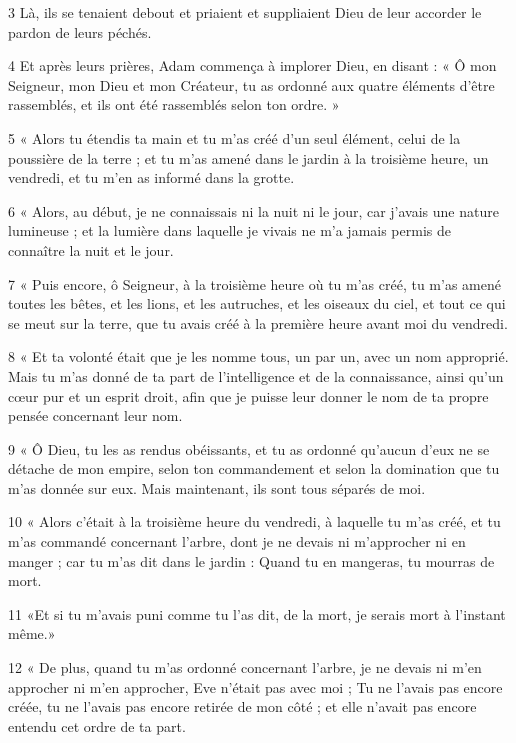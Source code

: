 \par 3 Là, ils se tenaient debout et priaient et suppliaient Dieu de leur accorder le pardon de leurs péchés.

\par 4 Et après leurs prières, Adam commença à implorer Dieu, en disant : « Ô mon Seigneur, mon Dieu et mon Créateur, tu as ordonné aux quatre éléments d'être rassemblés, et ils ont été rassemblés selon ton ordre. »

\par 5 « Alors tu étendis ta main et tu m'as créé d'un seul élément, celui de la poussière de la terre ; et tu m'as amené dans le jardin à la troisième heure, un vendredi, et tu m'en as informé dans la grotte.

\par 6 « Alors, au début, je ne connaissais ni la nuit ni le jour, car j'avais une nature lumineuse ; et la lumière dans laquelle je vivais ne m’a jamais permis de connaître la nuit et le jour.

\par 7 « Puis encore, ô Seigneur, à la troisième heure où tu m'as créé, tu m'as amené toutes les bêtes, et les lions, et les autruches, et les oiseaux du ciel, et tout ce qui se meut sur la terre, que tu avais créé à la première heure avant moi du vendredi.

\par 8 « Et ta volonté était que je les nomme tous, un par un, avec un nom approprié. Mais tu m'as donné de ta part de l'intelligence et de la connaissance, ainsi qu'un cœur pur et un esprit droit, afin que je puisse leur donner le nom de ta propre pensée concernant leur nom.

\par 9 « Ô Dieu, tu les as rendus obéissants, et tu as ordonné qu'aucun d'eux ne se détache de mon empire, selon ton commandement et selon la domination que tu m'as donnée sur eux. Mais maintenant, ils sont tous séparés de moi.

\par 10 « Alors c'était à la troisième heure du vendredi, à laquelle tu m'as créé, et tu m'as commandé concernant l'arbre, dont je ne devais ni m'approcher ni en manger ; car tu m'as dit dans le jardin : Quand tu en mangeras, tu mourras de mort.

\par 11 «Et si tu m'avais puni comme tu l'as dit, de la mort, je serais mort à l'instant même.»

\par 12 « De plus, quand tu m'as ordonné concernant l'arbre, je ne devais ni m'en approcher ni m'en approcher, Eve n'était pas avec moi ; Tu ne l'avais pas encore créée, tu ne l'avais pas encore retirée de mon côté ; et elle n’avait pas encore entendu cet ordre de ta part.

